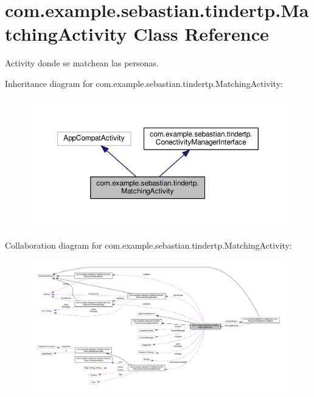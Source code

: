 \hypertarget{classcom_1_1example_1_1sebastian_1_1tindertp_1_1MatchingActivity}{}\section{com.\+example.\+sebastian.\+tindertp.\+Matching\+Activity Class Reference}
\label{classcom_1_1example_1_1sebastian_1_1tindertp_1_1MatchingActivity}


Activity donde se matchean las personas.  




Inheritance diagram for com.\+example.\+sebastian.\+tindertp.\+Matching\+Activity\+:\nopagebreak
\begin{figure}[H]
\begin{center}
\leavevmode
\includegraphics[width=350pt]{classcom_1_1example_1_1sebastian_1_1tindertp_1_1MatchingActivity__inherit__graph}
\end{center}
\end{figure}


Collaboration diagram for com.\+example.\+sebastian.\+tindertp.\+Matching\+Activity\+:\nopagebreak
\begin{figure}[H]
\begin{center}
\leavevmode
\includegraphics[width=350pt]{classcom_1_1example_1_1sebastian_1_1tindertp_1_1MatchingActivity__coll__graph}
\end{center}
\end{figure}
